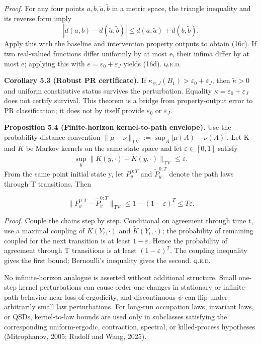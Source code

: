\documentclass[10pt]{article}
\begin{document}
\emph{Proof.} For any four points \(a,b,\widetilde a,\widetilde b\) in a metric space, the triangle inequality and its reverse form imply
\[
|d(a,b)-d(\widetilde a,\widetilde b)|\le d(a,\widetilde a)+d(b,\widetilde b).
\]
Apply this with the baseline and intervention property outputs to obtain (16c). If two real-valued functions differ uniformly by at most e, their infima differ by at most e; applying this with \(e=\varepsilon_0+\varepsilon_J\) yields (16d). \hfill\textsc{q.e.d.}

\textbf{Corollary 5.3 (Robust PR certificate).} If \(\kappa_{\psi,J}(B_1)>\varepsilon_0+\varepsilon_J\), then \(\widetilde\kappa>0\) and uniform constitutive status survives the perturbation. Equality \(\kappa=\varepsilon_0+\varepsilon_J\) does not certify survival. This theorem is a bridge from property-output error to PR classification; it does not by itself provide \(\varepsilon_0\) or \(\varepsilon_J\).

\textbf{Proposition 5.4 (Finite-horizon kernel-to-path envelope).} Use the probability-distance convention \(\|\mu-\nu\|_{\mathrm{TV}}:=\sup_A|\mu(A)-\nu(A)|\). Let K and \(\widetilde K\) be Markov kernels on the same state space and let \(\varepsilon\in[0,1]\) satisfy
\[
\sup_y\|K(y,\cdot)-\widetilde K(y,\cdot)\|_{\mathrm{TV}}\le\varepsilon.
\]
From the same point initial state y, let \(P_y^{0:T}\) and \(\widetilde P_y^{0:T}\) denote the path laws through T transitions. Then

\begin{equation}
\|P_y^{0:T}-\widetilde P_y^{0:T}\|_{\mathrm{TV}}
\le 1-(1-\varepsilon)^T\le T\varepsilon.
\tag{16e}\label{eq:16e}
\end{equation}

\emph{Proof.} Couple the chains step by step. Conditional on agreement through time t, use a maximal coupling of \(K(Y_t,\cdot)\) and \(\widetilde K(Y_t,\cdot)\); the probability of remaining coupled for the next transition is at least \(1-\varepsilon\). Hence the probability of agreement through T transitions is at least \((1-\varepsilon)^T\). The coupling inequality gives the first bound; Bernoulli's inequality gives the second. \hfill\textsc{q.e.d.}

No infinite-horizon analogue is asserted without additional structure. Small one-step kernel perturbations can cause order-one changes in stationary or infinite-path behavior near loss of ergodicity, and discontinuous \(\psi\) can flip under arbitrarily small law perturbations. For long-run occupation laws, invariant laws, or QSDs, kernel-to-law
bounds are used only in subclasses satisfying the corresponding uniform-ergodic, contraction, spectral, or killed-process hypotheses (Mitrophanov, 2005; Rudolf and Wang, 2025).
\end{document}
